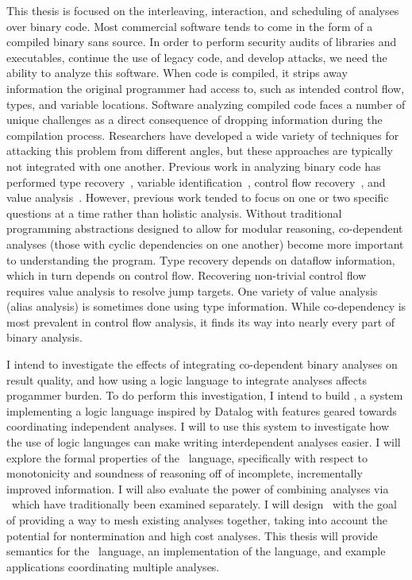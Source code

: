 {\fontsize{10}{12}\selectfont
This thesis is focused on the interleaving, interaction, and scheduling of analyses over binary code.
Most commercial software tends to come in the form of a compiled binary sans source.
In order to perform security audits of libraries and executables, continue the use of legacy code, and develop attacks, we need the ability to analyze this software.
When code is compiled, it strips away information the original programmer had access to, such as intended control flow, types, and variable locations.
Software analyzing compiled code faces a number of unique challenges as a direct consequence of dropping information during the compilation process.
Researchers have developed a wide variety of techniques for attacking this problem from different angles, but these approaches are typically not integrated with one another.
Previous work in analyzing binary code has performed type recovery~\cite{bitr}, variable identification~\cite{divine}, control flow recovery~\cite{jakstab,phoenix}, and value analysis~\cite{vsa}.
However, previous work tended to focus on one or two specific questions at a time rather than holistic analysis.
Without traditional programming abstractions designed to allow for modular reasoning, co-dependent analyses (those with cyclic dependencies on one another) become more important to understanding the program.
Type recovery depends on dataflow information\cite{bitr,tie,sndwrite}, which in turn depends on control flow.
Recovering non-trivial control flow requires value analysis to resolve jump targets.
One variety of value analysis (alias analysis) is sometimes done using type information.
While co-dependency is most prevalent in control flow analysis, it finds its way into nearly every part of binary analysis.
}

{\fontsize{10}{12}\selectfont
I intend to investigate the effects of integrating co-dependent binary analyses on result quality, and how using a logic language to integrate analyses affects progammer burden.
To do perform this investigation, I intend to build \sysname, a system implementing a logic language inspired by Datalog with features geared towards coordinating independent analyses.
I will to use this system to investigate how the use of logic languages can make writing interdependent analyses easier.
I will explore the formal properties of the \sysname\ language, specifically with respect to monotonicity and soundness of reasoning off of incomplete, incrementally improved information.
I will also evaluate the power of combining analyses via \sysname\ which have traditionally been examined separately.
I will design \sysname\ with the goal of providing a way to mesh existing analyses together, taking into account the potential for nontermination and high cost analyses.
This thesis will provide semantics for the \sysname\ language, an implementation of the language, and example applications coordinating multiple analyses.
}
